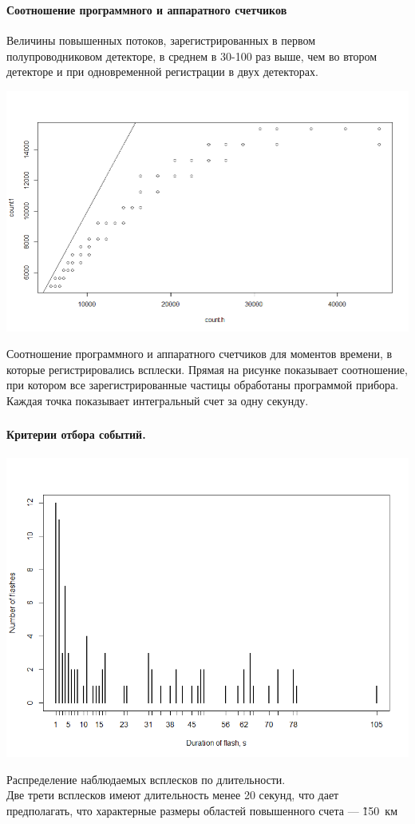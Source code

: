 \documentclass[t, aspectratio=43]{beamer}
\begin{document}
\begin{frame}	
\frametitle{\insertsection} 
\framesubtitle{Соотношение программного и аппаратного счетчиков}
{\tiny Величины повышенных потоков, зарегистрированных в первом полупроводниковом детекторе, в среднем в 30-100 раз выше, чем во втором детекторе и при одновременной регистрации в двух детекторах.}

\centering
\includegraphics[width=0.7\linewidth]{images/Rplot04}


\tiny{Соотношение программного и аппаратного счетчиков для моментов времени, в которые регистрировались всплески. Прямая на рисунке показывает соотношение, при котором все зарегистрированные частицы обработаны программой прибора. Каждая точка показывает интегральный счет за одну секунду.}
\end{frame}
\begin{frame}	
\frametitle{\insertsection} 
\framesubtitle{Критерии отбора событий.}

\begin{center}
	\includegraphics[width=0.7\linewidth]{images/Rplot12}
	
{\tiny 
	Распределение наблюдаемых всплесков по длительности.
	\\ Две трети всплесков имеют длительность менее 20 секунд, что дает предполагать, что характерные размеры областей повышенного счета --- \~150~км}
\end{center}


\end{frame}
\end{document}
